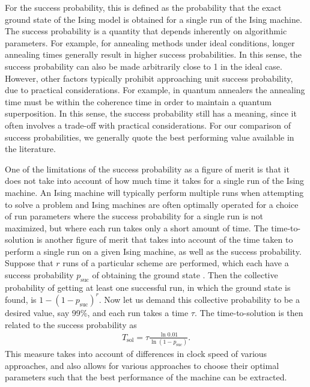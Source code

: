 \documentclass[fleqn,10pt]{wlscirep}
\begin{document}
For the success probability, this is defined as the probability that the exact ground state of the Ising model is obtained for a single run of the Ising machine.  
The success probability is a quantity that depends inherently on algorithmic parameters.  For example, for annealing methods under ideal conditions, longer annealing times generally result in higher success probabilities. In this sense, the success probability can also be made arbitrarily close to 1 in the ideal case.  However, other factors typically prohibit approaching unit success probability, due to practical considerations.  For example, in quantum annealers the annealing time must be within the coherence time in order to maintain a quantum superposition. %
In this sense, the success probability still has a meaning, since it often involves a trade-off with practical considerations.  For our comparison of success probabilities, we generally quote the best performing value available in the literature.  

One of the limitations of the success probability as a figure of merit is that it does not take into account of how much time it takes for a single run of the Ising machine.  An Ising machine will typically perform multiple runs when attempting to solve a problem and Ising machines are often optimally operated for a choice of run parameters where the success probability for a single run is not maximized, but where each run takes only a short amount of time. The time-to-solution is another figure of merit that takes into account of the time taken to perform a single run on a given Ising machine, as well as the success probability.  Suppose that $ r $ runs of a particular scheme are performed, which each have a success probability $ p_{\text{suc}} $ of obtaining the ground state .  Then the collective probability of getting at least one successful run, in which the ground state is found, is $ 1 - (1-p_{\text{suc}})^r$.  Now let us demand this collective probability to be a desired value, say 99\%, and each run takes a time $ \tau $.  The time-to-solution is then related to the success probability as
%
\begin{align}
T_{\text{sol}} = \tau \frac{\ln 0.01}{\ln (1-  p_{\text{suc}} )} .
\end{align}
%
This measure takes into account of differences in clock speed of various approaches, and also allows for various approaches to choose their optimal parameters such that the best performance of the machine can be extracted. 
\end{document}
